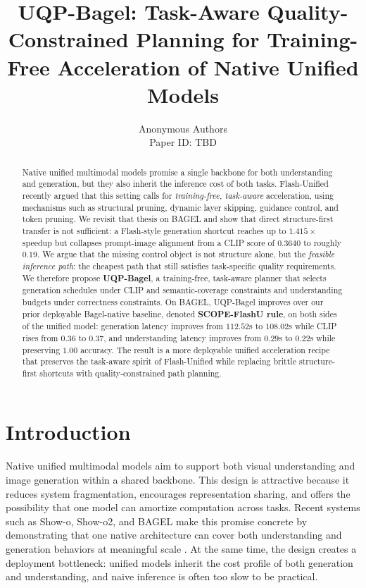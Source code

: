 \documentclass{article}
\title{UQP-Bagel: Task-Aware Quality-Constrained Planning for Training-Free Acceleration of Native Unified Models}
\author{Anonymous Authors \\ Paper ID: TBD}
\begin{document}
\maketitle

\begin{abstract}
Native unified multimodal models promise a single backbone for both understanding and generation, but they also inherit the inference cost of both tasks. Flash-Unified recently argued that this setting calls for \emph{training-free, task-aware} acceleration, using mechanisms such as structural pruning, dynamic layer skipping, guidance control, and token pruning. We revisit that thesis on BAGEL and show that direct structure-first transfer is not sufficient: a Flash-style generation shortcut reaches up to $1.415\times$ speedup but collapses prompt-image alignment from a CLIP score of $0.3640$ to roughly $0.19$. We argue that the missing control object is not structure alone, but the \emph{feasible inference path}: the cheapest path that still satisfies task-specific quality requirements. We therefore propose \textbf{UQP-Bagel}, a training-free, task-aware planner that selects generation schedules under CLIP and semantic-coverage constraints and understanding budgets under correctness constraints. On BAGEL, UQP-Bagel improves over our prior deployable Bagel-native baseline, denoted \textbf{SCOPE-FlashU rule}, on both sides of the unified model: generation latency improves from $112.52$s to $108.02$s while CLIP rises from $0.36$ to $0.37$, and understanding latency improves from $0.29$s to $0.22$s while preserving $1.00$ accuracy. The result is a more deployable unified acceleration recipe that preserves the task-aware spirit of Flash-Unified while replacing brittle structure-first shortcuts with quality-constrained path planning.
\end{abstract}

\section{Introduction}
Native unified multimodal models aim to support both visual understanding and image generation within a shared backbone. This design is attractive because it reduces system fragmentation, encourages representation sharing, and offers the possibility that one model can amortize computation across tasks. Recent systems such as Show-o, Show-o2, and BAGEL make this promise concrete by demonstrating that one native architecture can cover both understanding and generation behaviors at meaningful scale \citep{showo,showo2,bagel}. At the same time, the design creates a deployment bottleneck: unified models inherit the cost profile of both generation and understanding, and naive inference is often too slow to be practical.
\end{document}
